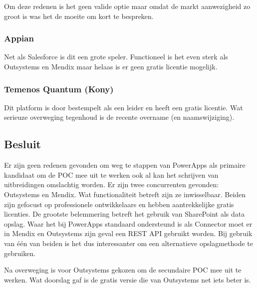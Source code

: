 Om deze redenen is het geen valide optie maar omdat de markt aanwezigheid zo groot is was het de moeite om kort te bespreken.

\subsubsection{Appian}

Net als Salesforce is dit een grote speler. Functioneel is het even sterk als Outsystems en Mendix maar helaas is er geen gratis licentie mogelijk.

\subsubsection{Temenos Quantum (Kony)}

Dit platform is door \textcite{Vincent2019} bestempelt als een leider en heeft een gratis licentie. Wat serieuze overweging tegenhoud is de recente overname (en naamswijziging).

\subsection{Besluit}

Er zijn geen redenen gevonden om weg te stappen van PowerApps als primaire kandidaat om de POC mee uit te werken ook al kan het schrijven van uitbreidingen omslachtig worden. Er zijn twee concurrenten gevonden: Outsystems en Mendix. Wat functionaliteit betreft zijn ze inwisselbaar. Beiden zijn gefocust op professionele ontwikkelaars en hebben aantrekkelijke gratis licenties. De grootste belemmering betreft het gebruik van SharePoint als data opslag. Waar het bij PowerApps standaard ondersteund is als Connector moet er in Mendix en Outsystems zijn geval een REST API gebruikt worden. Bij gebruik van één van beiden is het dus interessanter om een alternatieve opslagmethode te gebruiken.

Na overweging is voor Outsystems gekozen om de secundaire POC mee uit te werken. Wat doorslag gaf is de gratis versie die van Outsystems net iets beter is.


